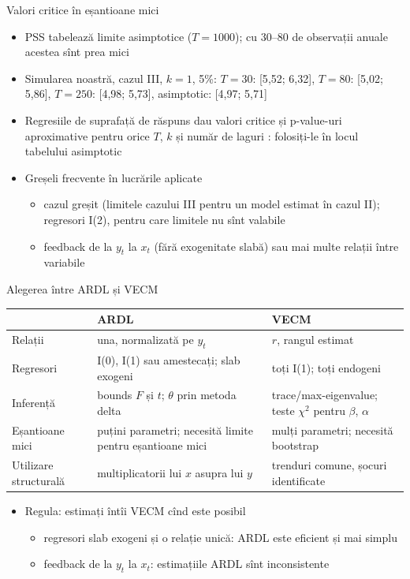 \begin{frame}{Valori critice în eșantioane mici}
\itemsize{\small}
\begin{itemize}
    \item PSS tabelează limite asimptotice ($T = 1000$); cu 30--80 de observații anuale acestea sînt prea mici 
    \item Simularea noastră, cazul III, $k = 1$, 5\%: $T = 30$: [5{,}52; 6{,}32], $T = 80$: [5{,}02; 5{,}86], $T = 250$: [4{,}98; 5{,}73], asimptotic: [4{,}97; 5{,}71]
    \item Regresiile de suprafață de răspuns dau valori critice și p-value-uri aproximative pentru orice $T$, $k$ și număr de laguri : folosiți-le în locul tabelului asimptotic
    \item Greșeli frecvente în lucrările aplicate
    \begin{itemize}
        \item cazul greșit (limitele cazului III pentru un model estimat în cazul II); regresori I(2), pentru care limitele nu sînt valabile
        \item feedback de la $y_t$ la $x_t$ (fără exogenitate slabă) sau mai multe relații între variabile
    \end{itemize}
\end{itemize}
\end{frame}

\begin{frame}{Alegerea între ARDL și VECM}
\itemsize{\small}
\begin{center}
\scriptsize
\begin{tabular}{>{\raggedright\arraybackslash}p{3.0cm}>{\raggedright\arraybackslash}p{4.4cm}>{\raggedright\arraybackslash}p{4.4cm}}
\toprule
 & \textbf{ARDL} & \textbf{VECM} \\
\midrule
Relații & una, normalizată pe $y_t$ & $r$, rangul estimat \\
Regresori & I(0), I(1) sau amestecați; slab exogeni & toți I(1); toți endogeni \\
Inferență & bounds $F$ și $t$; $\theta$ prin metoda delta & trace/max-eigenvalue; teste $\chi^2$ pentru $\beta$, $\alpha$ \\
Eșantioane mici & puțini parametri; necesită limite pentru eșantioane mici & mulți parametri; necesită bootstrap \\
Utilizare structurală & multiplicatorii lui $x$ asupra lui $y$ & trenduri comune, șocuri identificate \\
\bottomrule
\end{tabular}
\end{center}
\begin{itemize}
    \item Regula: estimați întîi VECM cînd este posibil
    \begin{itemize}
        \item regresori slab exogeni și o relație unică: ARDL este eficient și mai simplu
        \item feedback de la $y_t$ la $x_t$: estimațiile ARDL sînt inconsistente
    \end{itemize}
\end{itemize}
\end{frame}

